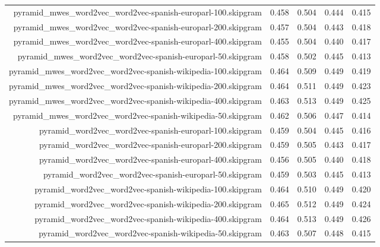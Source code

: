 \begin{figure*}
\begin{centering}
\begin{tabulary}{\textwidth}{|R|L|L|L|L|}
pyramid_mwes_word2vec_word2vec-spanish-europarl-100.skipgram & 0.458 & 0.504 & 0.444 & 0.415 \\
pyramid_mwes_word2vec_word2vec-spanish-europarl-200.skipgram & 0.457 & 0.504 & 0.443 & 0.418 \\
pyramid_mwes_word2vec_word2vec-spanish-europarl-400.skipgram & 0.455 & 0.504 & 0.440 & 0.417 \\
pyramid_mwes_word2vec_word2vec-spanish-europarl-50.skipgram & 0.458 & 0.502 & 0.445 & 0.413 \\
pyramid_mwes_word2vec_word2vec-spanish-wikipedia-100.skipgram & 0.464 & 0.509 & 0.449 & 0.419 \\
pyramid_mwes_word2vec_word2vec-spanish-wikipedia-200.skipgram & 0.464 & 0.511 & 0.449 & 0.423 \\
pyramid_mwes_word2vec_word2vec-spanish-wikipedia-400.skipgram & 0.463 & 0.513 & 0.449 & 0.425 \\
pyramid_mwes_word2vec_word2vec-spanish-wikipedia-50.skipgram & 0.462 & 0.506 & 0.447 & 0.414 \\
pyramid_word2vec_word2vec-spanish-europarl-100.skipgram & 0.459 & 0.504 & 0.445 & 0.416 \\
pyramid_word2vec_word2vec-spanish-europarl-200.skipgram & 0.459 & 0.505 & 0.443 & 0.417 \\
pyramid_word2vec_word2vec-spanish-europarl-400.skipgram & 0.456 & 0.505 & 0.440 & 0.418 \\
pyramid_word2vec_word2vec-spanish-europarl-50.skipgram & 0.459 & 0.503 & 0.445 & 0.413 \\
pyramid_word2vec_word2vec-spanish-wikipedia-100.skipgram & 0.464 & 0.510 & 0.449 & 0.420 \\
pyramid_word2vec_word2vec-spanish-wikipedia-200.skipgram & 0.465 & 0.512 & 0.449 & 0.424 \\
pyramid_word2vec_word2vec-spanish-wikipedia-400.skipgram & 0.464 & 0.513 & 0.449 & 0.426 \\
pyramid_word2vec_word2vec-spanish-wikipedia-50.skipgram & 0.463 & 0.507 & 0.448 & 0.415 \\


\end{tabulary}
\end{centering}
\end{figure*}
